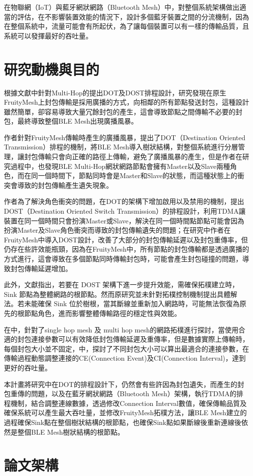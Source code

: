 \begin{ZhChapter}
在物聯網（IoT）與藍牙網狀網路（Bluetooth Mesh）中，對整個系統架構做出適當的評估，在不影響裝置效能的情況下，設計多個藍牙裝置之間的分流機制，因為在整個系統中，流量可能會有所起伏，為了讓每個裝置可以有一樣的傳輸品質，且系統可以發揮最好的吞吐量。
	

\section{研究動機與目的}

根據文獻\cite{112TIT00392032}中針對Multi-Hop的提出DOT及DOST排程設計，研究發現在原生FruityMesh上封包傳輸是採用廣播的方式，向相鄰的所有節點發送封包，這種設計雖然簡單，卻容易導致大量冗餘封包的產生，這會導致節點之間傳輸不必要的封包，最終導致整個BLE Mesh出現廣播風暴。

\cite{112TIT00392032}作者針對FruityMesh傳輸時產生的廣播風暴，提出了DOT（Destination Oriented Transmission）排程的機制，將BLE Mesh導入樹狀結構，對整個系統進行分層管理，讓封包傳輸只會向正確的路徑上傳輸，避免了廣播風暴的產生，但是作者在研究過程中，也發現BLE Multi-Hop網狀網路節點會擁有Master以及Slave兩種角色，而在同一個時間下，節點同時會是Master和Slave的狀態，而這種狀態上的衝突會導致的封包傳輸產生遺失現象。

\cite{112TIT00392032}作者為了解決角色衝突的問題，在DOT的架構下增加啟用以及禁用的機制，提出DOST（Destination Oriented Switch Transmission）的排程設計，利用TDMA讓裝置在同一個時間只會扮演Master或Slave，解決在同一個時間點節點可能會因為扮演Master及Slave角色衝突而導致的封包傳輸遺失的問題；在研究\cite{112TIT00392032}中作者在FruityMesh中導入DOST設計，改善了大部分的封包傳輸延遲以及封包重傳率，但仍存在些許效能瓶頸，因為在FruityMesh中，所有節點的封包傳輸都是透過廣播的方式進行，這會導致在多個節點同時傳輸封包時，可能會產生封包碰撞的問題，導致封包傳輸延遲增加。


此外，文獻指出，若要在 DOST 架構下進一步提升效能，需確保拓樸建立時，Sink 節點為整體網路的根節點。然而原研究並未針對拓樸控制機制提出具體解法。若未能確保 Sink 位於樹根，當其斷線並重新加入網路時，可能無法恢復為原先的根節點角色，進而影響整體傳輸路徑的穩定性與效能。

在\cite{112TIT00392032}\cite{110TIT00392037}中，針對了single hop mesh 及 multi hop mesh的網路拓樸進行探討，當使用合適的封包連接參數可以有效降低封包傳輸延遲及重傳率，但是數據實際上傳輸時，每個封包大小並不固定，\cite{109TIT00392031}中，探討了不同封包大小可以算出最適合的連接參數，在傳輸過程動態調整連接的CE(Connection Event)及CI(Connection Interval)，達到更好的吞吐量。

本計畫將研究中在DOT的排程設計下，仍然會有些許因為封包遺失，而產生的封包重傳的問題，以及在藍牙網狀網路（Bluetooth Mesh）架構，執行TDMA的排程機制，結合調整連線數據，透過修改Connection Interval數值，確保傳輸品質及確保系統可以產生最大吞吐量，並修改FruityMesh拓樸方法，讓BLE Mesh建立的過程確保Sink點在整個樹狀結構的根節點，也確保Sink點如果斷線後重新連線後依然是整個BLE Mesh樹狀結構的根節點。

\section{論文架構}



\end{ZhChapter}